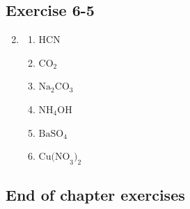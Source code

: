 \subsection{Exercise 6-5} 
\begin{multicols}{3}
\begin{enumerate}[itemsep=6pt, label=\textbf{\arabic*}.]
\setcounter{enumi}{1}
\item %
\begin{enumerate}[noitemsep, label=\textbf{(\alph*)} ]
\item $\text{HCN}$
\item $\text{CO}_{2}$
\item $\text{Na}_{2}\text{CO}_{3}$
\item $\text{NH}_{4}\text{OH}$
\item $\text{BaSO}_4$
\item $\text{Cu(NO}_3\text{)}_{2}$
\end{enumerate}
    \end{enumerate}
\end{multicols}

\subsection{End of chapter exercises}

